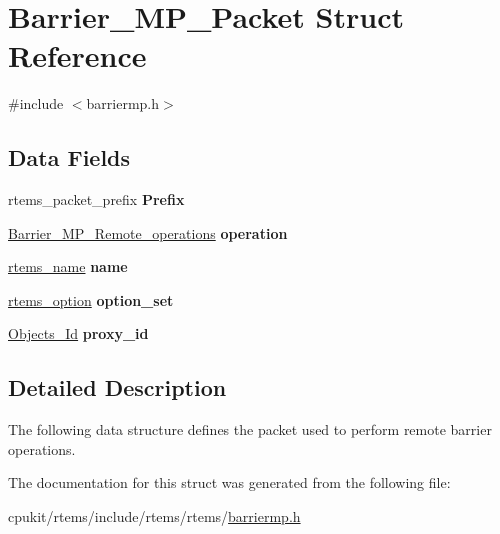 \hypertarget{structBarrier__MP__Packet}{}\section{Barrier\+\_\+\+M\+P\+\_\+\+Packet Struct Reference}
\label{structBarrier__MP__Packet}


{\ttfamily \#include $<$barriermp.\+h$>$}

\subsection*{Data Fields}
\begin{DoxyCompactItemize}
\item 
\mbox{\label{structBarrier__MP__Packet_a85b9b35b4fe87ec6c3fc29ebd5f532d8}} 
rtems\+\_\+packet\+\_\+prefix {\bfseries Prefix}
\item 
\mbox{\label{structBarrier__MP__Packet_a95678055f19580fa73b52e30285400e2}} 
\mbox{\hyperlink{group__ClassicBarrierMP_ga14a42806fd76d110a17d806124a892d0}{Barrier\+\_\+\+M\+P\+\_\+\+Remote\+\_\+operations}} {\bfseries operation}
\item 
\mbox{\label{structBarrier__MP__Packet_a249284b4f50a23e2d54662254ff94e22}} 
\mbox{\hyperlink{group__ClassicTasks_ga55fb63c49f68c0cbd9bee004da15b1fd}{rtems\+\_\+name}} {\bfseries name}
\item 
\mbox{\label{structBarrier__MP__Packet_a2537b5893584da2bf6701e34634d78e9}} 
\mbox{\hyperlink{group__ClassicOptions_gad26685eb0e60a9650082935c31920e29}{rtems\+\_\+option}} {\bfseries option\+\_\+set}
\item 
\mbox{\label{structBarrier__MP__Packet_a6f0adaf0e4b87643bb4f620067d40117}} 
\mbox{\hyperlink{group__RTEMSScoreObject_ga5821f52a51072941bdd603e542d0863e}{Objects\+\_\+\+Id}} {\bfseries proxy\+\_\+id}
\end{DoxyCompactItemize}


\subsection{Detailed Description}
The following data structure defines the packet used to perform remote barrier operations. 

The documentation for this struct was generated from the following file\+:\begin{DoxyCompactItemize}
\item 
cpukit/rtems/include/rtems/rtems/\mbox{\hyperlink{barriermp_8h}{barriermp.\+h}}\end{DoxyCompactItemize}
